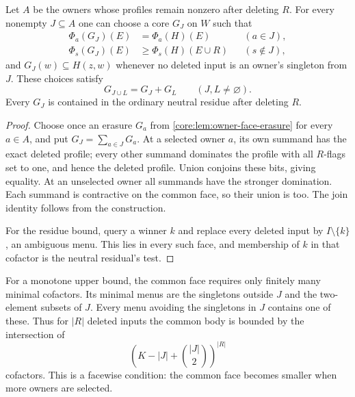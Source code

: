 \begin{corollary}
\label{core:cor:owner-face-family}
Let $A$ be the owners whose profiles remain nonzero after deleting $R$.
For every nonempty $J\subseteq A$ one can choose a core $G_J$ on $W$
such that
\[
 \begin{aligned}
 \Phi_a(G_J)(E)&=\Phi_a(H)(E)&& (a\in J),\\
 \Phi_s(G_J)(E)&\geq\Phi_s(H)(E\cup R)&& (s\notin J),
 \end{aligned}
\]
and $G_J(w)\subseteq H(z,w)$ whenever no deleted input is an owner's
singleton from $J$. These choices satisfy
\[
 G_{J\cup L}=G_J+G_L\qquad(J,L\ne\varnothing).
\]
Every $G_J$ is contained in the ordinary neutral residue after deleting $R$.
\end{corollary}
\begin{proof}
Choose once an erasure $G_a$ from \cref{core:lem:owner-face-erasure}
for every $a\in A$, and put $G_J=\sum_{a\in J}G_a$.
At a selected owner $a$, its own summand has the exact deleted profile;
every other summand dominates the profile with all $R$-flags set to one,
and hence the deleted profile. Union conjoins these bits, giving equality.
At an unselected owner all summands have the stronger domination.
Each summand is contractive on the common face, so their union is too.
The join identity follows from the construction.

For the residue bound, query a winner $k$ and replace every deleted input
by $I\setminus\{k\}$, an ambiguous menu. This lies in every such face,
and membership of $k$ in that cofactor is the neutral residual's test.
\end{proof}

For a monotone upper bound, the common face requires only finitely many
minimal cofactors. Its minimal menus are the singletons outside $J$ and
the two-element subsets of $J$. Every menu avoiding the singletons in $J$
contains one of these. Thus for $|R|$ deleted inputs the common body is
bounded by the intersection of
\[
 \left(K-|J|+\binom{|J|}{2}\right)^{|R|}
\]
cofactors. This is a facewise condition: the common face becomes smaller
when more owners are selected.


